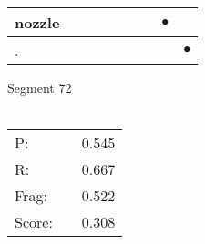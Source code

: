 \documentclass[landscape]{article}
\newcommand{\ssp}{\hspace{2pt}}
\newcommand{\mex}{\cellcolor{g}$\bullet$}
\begin{document}
\begin{tabular}{|l|p{10pt}|p{10pt}|p{10pt}|p{10pt}|p{10pt}|p{10pt}|p{10pt}|p{10pt}|}
\hline
\ssp \cellcolor{ref6}nozzle \ssp&\hspace{2pt}&\hspace{2pt}&\hspace{2pt}&\hspace{2pt}&\hspace{2pt}&\hspace{2pt}&\hspace{2pt}\mex&\hspace{2pt}\\
\hline
\ssp \cellcolor{ref7}. \ssp&\hspace{2pt}&\hspace{2pt}&\hspace{2pt}&\hspace{2pt}&\hspace{2pt}&\hspace{2pt}&\hspace{2pt}&\hspace{2pt}\mex\\
\hline
\end{tabular}

\vspace{6pt}
\noindent Segment 72\\\\
\noindent\begin{tabular}{lm{12pt}r}
\hline
P:&&0.545\\
R:&&0.667\\
Frag:&&0.522\\
Score:&&0.308\\
\end{tabular}

\newpage
\end{document}

